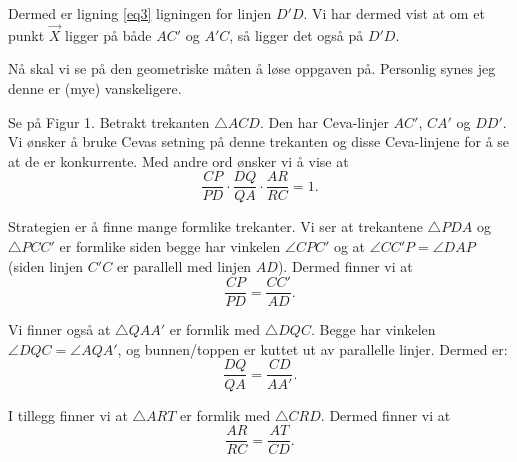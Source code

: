 \documentclass[11pt, norsk]{article}
\begin{document}
\begin{losn}
Dermed er ligning \eqref{eq3} ligningen for linjen $D'D$. Vi har dermed vist at om et punkt $\vec X$ ligger på både $AC'$ og $A'C$, så ligger det også på $D'D$.

Nå skal vi se på den geometriske måten å løse oppgaven på. Personlig synes jeg denne er (mye) vanskeligere. 

Se på Figur 1. Betrakt trekanten $\triangle ACD$. Den har Ceva-linjer $AC'$, $CA'$ og $DD'$. Vi ønsker å bruke Cevas setning på denne trekanten og disse Ceva-linjene for å se at de er konkurrente. Med andre ord ønsker vi å vise at 
$$
\frac{CP}{PD} \cdot \frac{DQ}{QA} \cdot \frac{AR}{RC} = 1.
$$

Strategien er å finne mange formlike trekanter. Vi ser at trekantene $\triangle PDA$ og $\triangle PCC'$ er formlike siden begge har vinkelen $\angle CPC'$ og at $\angle CC'P = \angle DAP$ (siden linjen $C'C$ er parallell med linjen $AD$). Dermed finner vi at
$$
\frac{CP}{PD} = \frac{CC'}{AD}.
$$

Vi finner også at $\triangle QAA'$ er formlik med $\triangle DQC$. Begge har vinkelen $\angle DQC=\angle AQA'$, og bunnen/toppen er kuttet ut av parallelle linjer. Dermed er:
$$
\frac{DQ}{QA} = \frac{CD}{AA'}.
$$

I tillegg finner vi at $\triangle ART$ er formlik med $\triangle CRD$. Dermed finner vi at
$$
\frac{AR}{RC}=\frac{AT}{CD}.
$$


\end{losn}
\end{document}
